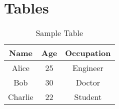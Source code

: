 \documentclass[12pt]{article}
\begin{document}
\section{Tables}

\begin{table}[h]
\centering
\begin{tabular}{|c|c|c|}
\hline
\textbf{Name} & \textbf{Age} & \textbf{Occupation} \\
\hline
Alice & 25 & Engineer \\
Bob & 30 & Doctor \\
Charlie & 22 & Student \\
\hline
\end{tabular}
\caption{Sample Table}
\end{table}
\end{document}
